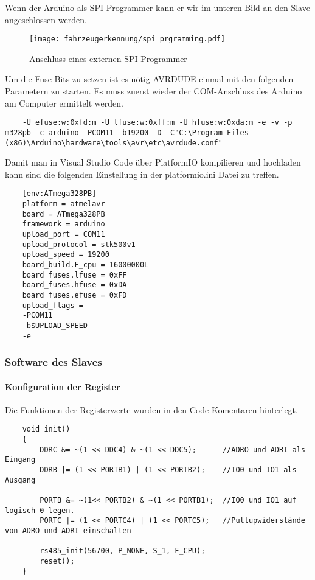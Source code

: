Wenn der Arduino als SPI-Programmer kann er wir im unteren Bild an den Slave angeschlossen werden.

\begin{figure}[H]
    \centering
    \texttt{[image: fahrzeugerkennung/spi\_prgramming.pdf]}
    \caption{Anschluss eines externen SPI Programmer}
\end{figure}

Um die Fuse-Bits zu setzen ist es nötig AVRDUDE einmal mit den folgenden Parametern zu starten. Es muss zuerst wieder der COM-Anschluss des Arduino am Computer ermittelt werden.

\begin{listing}[H]
    \begin{verbatim}
    -U efuse:w:0xfd:m -U lfuse:w:0xff:m -U hfuse:w:0xda:m -e -v -p m328pb -c arduino -PCOM11 -b19200 -D -C"C:\Program Files (x86)\Arduino\hardware\tools\avr\etc\avrdude.conf"
    \end{verbatim}
    \caption{AVRDUDE Argumente für die Fuse-Bits}
\end{listing}

Damit man  in Visual Studio Code über PlatformIO kompilieren und hochladen kann sind die folgenden Einstellung in der platformio.ini Datei zu treffen.


\begin{listing}[H]
    \begin{verbatim}
    [env:ATmega328PB]
    platform = atmelavr
    board = ATmega328PB
    framework = arduino
    upload_port = COM11
    upload_protocol = stk500v1
    upload_speed = 19200
    board_build.F_cpu = 16000000L
    board_fuses.lfuse = 0xFF
    board_fuses.hfuse = 0xDA
    board_fuses.efuse = 0xFD
    upload_flags = 
    -PCOM11
    -b$UPLOAD_SPEED
    -e
    \end{verbatim}
    \caption{PlatformIO Einstellungen}
\end{listing}
\subsubsection{Software des Slaves}
\paragraph{Konfiguration der Register}\mbox{} 

Die Funktionen der Registerwerte wurden in den Code-Komentaren hinterlegt.
\begin{listing}[H]
    \begin{verbatim}
    void init()
    {
        DDRC &= ~(1 << DDC4) & ~(1 << DDC5);      //ADRO und ADRI als Eingang 
        DDRB |= (1 << PORTB1) | (1 << PORTB2);    //IO0 und IO1 als Ausgang
    
        PORTB &= ~(1<< PORTB2) & ~(1 << PORTB1);  //IO0 und IO1 auf logisch 0 legen.
        PORTC |= (1 << PORTC4) | (1 << PORTC5);   //Pullupwiderstände von ADRO und ADRI einschalten
        
        rs485_init(56700, P_NONE, S_1, F_CPU);
        reset();
    }
    \end{verbatim}
    \caption{allgemeine Registereinstellungen}
\end{listing}

